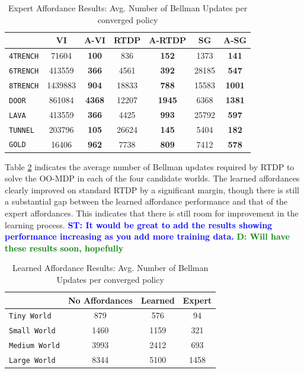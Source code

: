 \documentclass[conference]{IEEEtran}
\newcommand{\stnote}[1]{\textcolor{Blue}{\textbf{ST: #1}}}
\newcommand{\dnote}[1]{\textcolor{Green}{\textbf{D: #1}}}
\begin{document}
\begin{table}
\centering
\caption{Expert Affordance Results: Avg. Number of Bellman Updates per converged policy}
\begin{tabular}{ l || c c | c c | c  c }
  & VI & A-VI & RTDP & A-RTDP & SG & A-SG \\ \hline
  \texttt{4TRENCH} 		&	71604 		& 	{\bf 100} 		& 	836 		& 	{\bf 152} 		&	1373 	& 	{\bf 141}  			\\
  \texttt{6TRENCH} 		&	413559 	 	& 	{\bf 366}  		& 	4561 	& 	{\bf 392} 		&	28185 	& 	{\bf 547}  \\
  \texttt{8TRENCH} 		&	1439883 		& 	{\bf 904}		& 	18833	& 	{\bf 788}		&	15583	& 	{\bf 1001} 			\\
  \texttt{DOOR} 		&	861084 	 	& 	{\bf 4368}		& 	12207	& 	{\bf 1945}		&	6368		& 	{\bf 1381}	\\
  \texttt{LAVA}  		&	413559 		& 	{\bf 366}	 	& 	4425 	& 	{\bf 993}  		&	25792	& 	{\bf 597}   \\
  \texttt{TUNNEL}  		&	203796 		& 	{\bf 105}		& 	26624	& 	{\bf 145}  		&	5404 	& 	{\bf 182}	\\
  \texttt{GOLD}  		&	16406		& 	{\bf 962}		& 	7738 	& 	{\bf 809}  		&	7412 	& 	{\bf 578}
\end{tabular}
\label{table:blocks}	
\label{table:hard-results}
\end{table}

Table \ref{table:learned-results} indicates the average number of Bellman updates required by RTDP to solve the OO-MDP
in each of the four candidate worlds. The learned affordances clearly improved on standard RTDP by a significant margin, though
there is still a substantial gap between the learned affordance performance and that of the expert affordances. This indicates that
there is still room for improvement in the learning process.
\stnote{It would be great to add the results showing performance increasing as you add more training data. }
\dnote{Will have these results soon, hopefully}
\begin{table}
\centering
\caption{Learned Affordance Results: Avg. Number of Bellman Updates per converged policy}
\begin{tabular}{ l || c c c }
  & No Affordances & Learned & Expert  \\ \hline
  \texttt{Tiny World}  		& 	879		&	576	&	 94	\\
  \texttt{Small World}  	& 	1460		&	1159	&	321  \\
  \texttt{Medium World}  	& 	3993		&	2412	&	693  \\
  \texttt{Large World}  	& 	8344		&	5100	&	1458
\end{tabular}
\label{table:learned-results}
\end{table}
\end{document}
